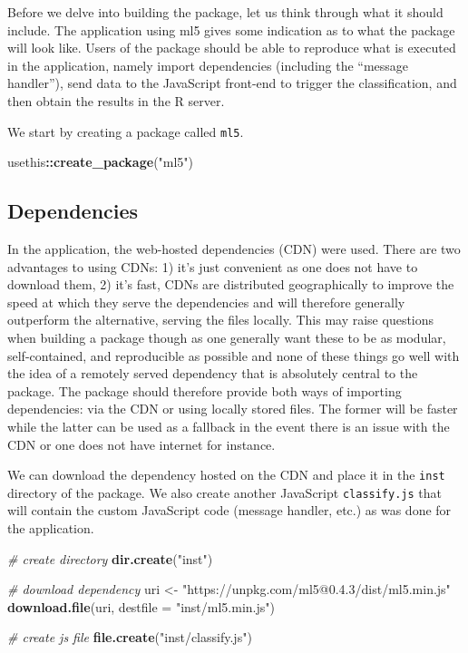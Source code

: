 \documentclass[
]{krantz}
\makeatletter
\newenvironment{Shaded}{\begin{snugshade}}{\end{snugshade}}
\newcommand{\CommentTok}[1]{\textcolor[rgb]{0.37,0.37,0.37}{\textit{#1}}}
\newcommand{\DataTypeTok}[1]{\textcolor[rgb]{0.27,0.27,0.27}{#1}}
\newcommand{\KeywordTok}[1]{\textcolor[rgb]{0.27,0.27,0.27}{\textbf{#1}}}
\newcommand{\NormalTok}[1]{#1}
\newcommand{\OperatorTok}[1]{\textcolor[rgb]{0.43,0.43,0.43}{\textbf{#1}}}
\newcommand{\StringTok}[1]{\textcolor[rgb]{0.5,0.5,0.5}{#1}}
\newenvironment{kframe}{%
\medskip{}
\setlength{\fboxsep}{.8em}
 \def\at@end@of@kframe{}%
 \ifinner\ifhmode%
  \def\at@end@of@kframe{\end{minipage}}%
  \begin{minipage}{\columnwidth}%
 \fi\fi%
 \def\FrameCommand##1{\hskip\@totalleftmargin \hskip-\fboxsep
 \colorbox{shadecolor}{##1}\hskip-\fboxsep
     \hskip-\linewidth \hskip-\@totalleftmargin \hskip\columnwidth}%
 \MakeFramed {\advance\hsize-\width
   \@totalleftmargin\z@ \linewidth\hsize
   \@setminipage}}%
 {\par\unskip\endMakeFramed%
 \at@end@of@kframe}
\renewenvironment{Shaded}{\begin{kframe}}{\end{kframe}}
\makeatother
\begin{document}
Before we delve into building the package, let us think through what it should include. The application using ml5 gives some indication as to what the package will look like. Users of the package should be able to reproduce what is executed in the application, namely import dependencies (including the ``message handler''), send data to the JavaScript front-end to trigger the classification, and then obtain the results in the R server.

We start by creating a package called \texttt{ml5}.

\begin{Shaded}
\begin{Highlighting}[]
\NormalTok{usethis}\OperatorTok{::}\KeywordTok{create\_package}\NormalTok{(}\StringTok{"ml5"}\NormalTok{)}
\end{Highlighting}
\end{Shaded}

\hypertarget{shiny-complete-pkg-deps}{%
\subsection{Dependencies}\label{shiny-complete-pkg-deps}}

In the application, the web-hosted dependencies (CDN) were used. There are two advantages to using CDNs: 1) it's just convenient as one does not have to download them, 2) it's fast, CDNs are distributed geographically to improve the speed at which they serve the dependencies and will therefore generally outperform the alternative, serving the files locally. This may raise questions when building a package though as one generally want these to be as modular, self-contained, and reproducible as possible and none of these things go well with the idea of a remotely served dependency that is absolutely central to the package. The package should therefore provide both ways of importing dependencies: via the CDN or using locally stored files. The former will be faster while the latter can be used as a fallback in the event there is an issue with the CDN or one does not have internet for instance.

We can download the dependency hosted on the CDN and place it in the \texttt{inst} directory of the package. We also create another JavaScript \texttt{classify.js} that will contain the custom JavaScript code (message handler, etc.) as was done for the application.

\begin{Shaded}
\begin{Highlighting}[]
\CommentTok{\# create directory}
\KeywordTok{dir.create}\NormalTok{(}\StringTok{"inst"}\NormalTok{)}

\CommentTok{\# download dependency}
\NormalTok{uri <{-}}\StringTok{ "https://unpkg.com/ml5@0.4.3/dist/ml5.min.js"}
\KeywordTok{download.file}\NormalTok{(uri, }\DataTypeTok{destfile =} \StringTok{"inst/ml5.min.js"}\NormalTok{)}

\CommentTok{\# create js file }
\KeywordTok{file.create}\NormalTok{(}\StringTok{"inst/classify.js"}\NormalTok{)}
\end{Highlighting}
\end{Shaded}
\end{document}

